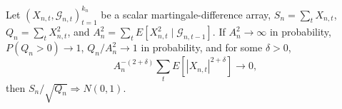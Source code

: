 Let \((X_{n,t},\mathcal G_{n,t})_{t=1}^{k_n}\) be a scalar martingale-difference array, \(S_n=\sum_tX_{n,t}\), \(Q_n=\sum_tX_{n,t}^2\), and \(A_n^2=\sum_tE[X_{n,t}^2\mid\mathcal G_{n,t-1}]\). If \(A_n^2\to\infty\) in probability, \(P(Q_n>0)\to1\), \(Q_n/A_n^2\to1\) in probability, and for some \(\delta>0\),
\[
 A_n^{-(2+\delta)}\sum_tE[|X_{n,t}|^{2+\delta}]\to0,
\]
then \(S_n/\sqrt{Q_n}\Rightarrow N(0,1)\).
